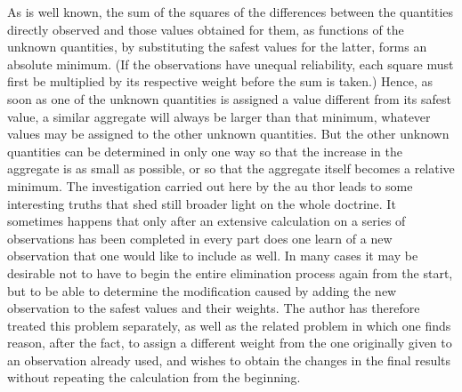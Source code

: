 As is well known, the sum of the squares of the differences between the quantities directly observed and those values obtained for them, as functions of the unknown quantities, by substituting the safest values for the latter, forms an absolute minimum. (If the observations have unequal reliability, each square must first be multiplied by its respective weight before the sum is taken.) Hence, as soon as one of the unknown quantities is assigned a value different from its safest value, a similar aggregate will always be larger than that minimum, whatever values may be assigned to the other unknown quantities. But the other unknown quantities can be determined in only one way so that the increase in the aggregate is as small as possible, or so that the aggregate itself becomes a relative minimum. The investigation carried out here by the au%
thor leads to some interesting truths that shed still broader light on the whole doctrine.
It sometimes happens that only after an extensive calculation on a series of observations has been completed in every part does one learn of a new observation that one would like to include as well. In many cases it may be desirable not to have to begin the entire elimination process again from the start, but to be able to determine the modification caused by adding the new observation to the safest values and their weights. The author has therefore treated this problem separately, as well as the related problem in which one finds reason, after the fact, to assign a different weight from the one originally given to an observation already used, and wishes to obtain the changes in the final results without repeating the calculation from the beginning.

